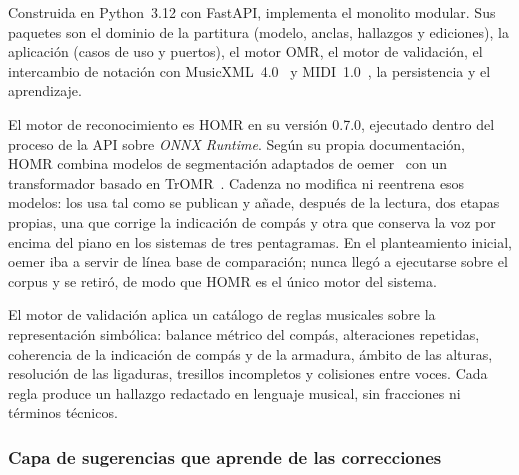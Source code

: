 \documentclass[conference]{IEEEtran}
\begin{document}
Construida en Python~3.12 con FastAPI, implementa el monolito modular. Sus
paquetes son el dominio de la partitura (modelo, anclas, hallazgos y
ediciones), la aplicación (casos de uso y puertos), el motor OMR, el motor
de validación, el intercambio de notación con MusicXML~4.0~\cite{musicxml2021}
y MIDI~1.0~\cite{midi1996}, la persistencia y el aprendizaje.

El motor de reconocimiento es HOMR en su versión 0.7.0, ejecutado dentro
del proceso de la API sobre \textit{ONNX Runtime}. Según su propia
documentación, HOMR combina modelos de segmentación adaptados de
oemer~\cite{oemer2021} con un transformador basado en
TrOMR~\cite{tromr2023}. Cadenza no modifica ni reentrena esos modelos: los
usa tal como se publican y añade, después de la lectura, dos etapas
propias, una que corrige la indicación de compás y otra que conserva la
voz por encima del piano en los sistemas de tres pentagramas.
En el planteamiento inicial, oemer iba a servir de línea base de
comparación; nunca llegó a ejecutarse sobre el corpus y se retiró, de modo
que HOMR es el único motor del sistema.

El motor de validación aplica un catálogo de reglas musicales sobre la
representación simbólica: balance métrico del compás, alteraciones
repetidas, coherencia de la indicación de compás y de la armadura, ámbito
de las alturas, resolución de las ligaduras, tresillos incompletos y
colisiones entre voces. Cada regla produce un hallazgo redactado en
lenguaje musical, sin fracciones ni términos técnicos.

\subsubsection{Capa de sugerencias que aprende de las correcciones}
\end{document}
